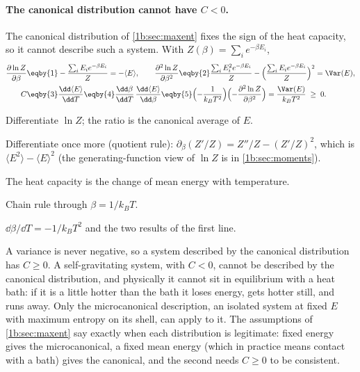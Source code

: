 \paragraph{The canonical distribution cannot have $C<0$.}
The canonical distribution of \cref{1b:sec:maxent} fixes the sign of the heat
capacity, so it cannot describe such a system. With $Z(\beta)=\sum_ie^{-\beta E_i}$,
\begin{align*}
  \frac{\partial\ln Z}{\partial\beta}
  &\eqby{1}-\frac{\sum_iE_ie^{-\beta E_i}}{Z}=-\langle E\rangle,
  \qquad
  \frac{\partial^2\ln Z}{\partial\beta^2}
  \eqby{2}\frac{\sum_iE_i^2e^{-\beta E_i}}{Z}-\Bigl(\frac{\sum_iE_ie^{-\beta E_i}}{Z}\Bigr)^2
  =\Var(E),
  \\
  C
  &\eqby{3}\frac{\dd\langle E\rangle}{\dd T}
   \eqby{4}\frac{\dd\beta}{\dd T}\,\frac{\dd\langle E\rangle}{\dd\beta}
   \eqby{5}\Bigl(-\frac1{k_BT^2}\Bigr)\Bigl(-\frac{\partial^2\ln Z}{\partial\beta^2}\Bigr)
   =\frac{\Var(E)}{k_BT^2}\;\ge\;0 .
\end{align*}
\begin{explain}
  \item Differentiate $\ln Z$; the ratio is the canonical average of $E$.
  \item Differentiate once more (quotient rule): $\partial_\beta(Z'/Z)=Z''/Z-(Z'/Z)^2$,
        which is $\langle E^2\rangle-\langle E\rangle^2$ (the generating-function view
        of $\ln Z$ is in \cref{1b:sec:moments}).
  \item The heat capacity is the change of mean energy with temperature.
  \item Chain rule through $\beta=1/k_BT$.
  \item $\dd\beta/\dd T=-1/k_BT^2$ and the two results of the first line.
\end{explain}
A variance is never negative, so a system described by the canonical distribution
has $C\ge0$. A self-gravitating system, with $C<0$, cannot be described by the
canonical distribution, and physically it cannot sit in equilibrium with a heat bath:
if it is a little hotter than the bath it loses energy, gets hotter still, and runs
away. Only the microcanonical description, an isolated system at fixed $E$ with
maximum entropy on its shell, can apply to it. The assumptions of
\cref{1b:sec:maxent} say exactly when each distribution is legitimate: fixed energy
gives the microcanonical, a fixed mean energy (which in practice means contact with
a bath) gives the canonical, and the second needs $C\ge0$ to be consistent.

